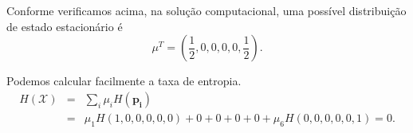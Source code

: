 \begin{questions}
\begin{solution}
Conforme verificamos acima, na solução computacional, uma possível
distribuição de estado estacionário é
\begin{equation}
\mu^T = \left( \frac{1}{2}, 0, 0, 0, 0, \frac{1}{2} \right) .
\end{equation}

Podemos calcular facilmente a taxa de entropia.
\begin{eqnarray}
  H(\mathcal{X}) &=& \sum_i \mu_i H( \mathbf{p_i} ) \nonumber \\
        &=& \mu_1 H(1,0,0,0,0,0) + 0 + 0 + 0 + 0 + \mu_6 H(0,0,0,0,0,1) = 0 .
\end{eqnarray} 

\end{solution}
\end{questions}
